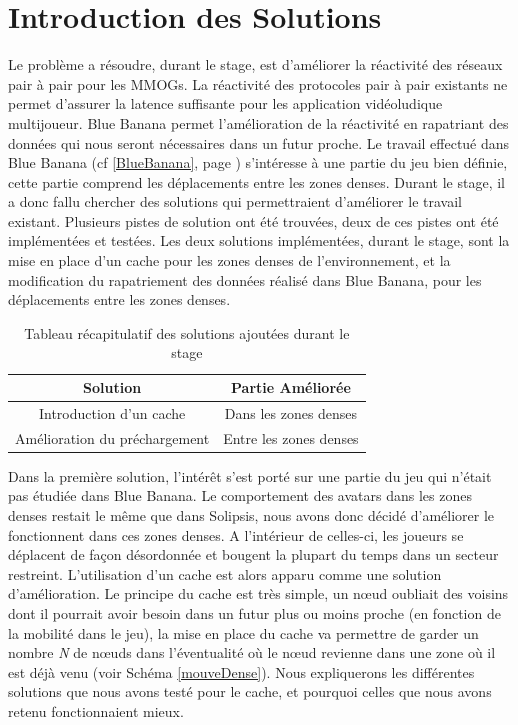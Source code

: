\section{Introduction des Solutions}
\label{introSolutions}
	Le problème a résoudre, durant le stage, est d'améliorer la réactivité des réseaux pair à pair pour les MMOGs. La réactivité des protocoles pair à pair existants ne permet d'assurer la latence suffisante pour les application vidéoludique multijoueur. Blue Banana permet l'amélioration de la réactivité en rapatriant des données qui nous seront nécessaires dans un futur proche. Le travail effectué dans Blue Banana (cf \ref{BlueBanana}, page \pageref{BlueBanana}) s'intéresse à une partie du jeu bien définie, cette partie comprend les déplacements entre les zones denses. Durant le stage, il a donc fallu chercher des solutions qui permettraient d'améliorer le travail existant. Plusieurs pistes de solution ont été trouvées, deux de ces pistes ont été implémentées et testées. Les deux solutions implémentées, durant le stage, sont la mise en place d'un cache pour les zones denses de l'environnement, et la modification du rapatriement des données réalisé dans Blue Banana, pour les déplacements entre les zones denses.
\begin{table}[!h]
  \begin{center}
    \begin{tabular}{|c|c|}
      \hline
      Solution & Partie Améliorée \\
      \hline
      Introduction d'un cache  & Dans les zones denses \\
      Amélioration du préchargement & Entre les zones denses \\
      \hline
    \end{tabular}
  \end{center}
  \label{tab:config2}
  \caption{Tableau récapitulatif des solutions ajoutées durant le stage}
\end{table}
\par Dans la première solution, l'intérêt s'est porté sur une partie du jeu qui n'était pas étudiée dans Blue Banana. Le comportement des avatars dans les zones denses restait le même que dans Solipsis, nous avons donc décidé d'améliorer le fonctionnent dans ces zones denses. A l'intérieur de celles-ci, les joueurs se déplacent de façon désordonnée et bougent la plupart du temps dans un secteur restreint. L'utilisation d'un cache est alors apparu comme une solution d'amélioration. Le principe du cache est très simple, un nœud oubliait des voisins dont il pourrait avoir besoin dans un futur plus ou moins proche (en fonction de la mobilité dans le jeu), la mise en place du cache va permettre de garder un nombre \textit{N} de nœuds dans l'éventualité où le nœud revienne dans une zone où il est déjà venu (voir Schéma \ref{mouveDense}). Nous expliquerons les différentes solutions que nous avons testé pour le cache, et pourquoi celles que nous avons retenu fonctionnaient mieux.
